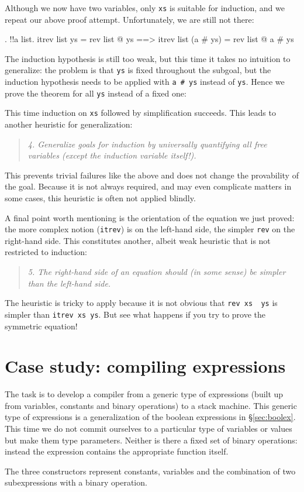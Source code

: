 Although we now have two variables, only \texttt{xs} is suitable for
induction, and we repeat our above proof attempt. Unfortunately, we are still
not there:
\begin{ttbox}\makeatother
{. !!a list.}
{\out       itrev list ys = rev list @ ys}
{\out       ==> itrev list (a # ys) = rev list @ a # ys}
\end{ttbox}
The induction hypothesis is still too weak, but this time it takes no
intuition to generalize: the problem is that \texttt{ys} is fixed throughout
the subgoal, but the induction hypothesis needs to be applied with
\texttt{a \# ys} instead of \texttt{ys}. Hence we prove the theorem
for all \texttt{ys} instead of a fixed one:
\begin{ttbox}\makeatother
\end{ttbox}
This time induction on \texttt{xs} followed by simplification succeeds. This
leads to another heuristic for generalization:
\begin{quote}
{\em 4. Generalize goals for induction by universally quantifying all free
variables {\em(except the induction variable itself!)}.}
\end{quote}
This prevents trivial failures like the above and does not change the
provability of the goal. Because it is not always required, and may even
complicate matters in some cases, this heuristic is often not
applied blindly.

A final point worth mentioning is the orientation of the equation we just
proved: the more complex notion (\texttt{itrev}) is on the left-hand
side, the simpler \texttt{rev} on the right-hand side. This constitutes
another, albeit weak heuristic that is not restricted to induction:
\begin{quote}
  {\em 5. The right-hand side of an equation should (in some sense) be
    simpler than the left-hand side.}
\end{quote}
The heuristic is tricky to apply because it is not obvious that
\texttt{rev xs \at\ ys} is simpler than \texttt{itrev xs ys}. But see what
happens if you try to prove the symmetric equation!


\section{Case study: compiling expressions}
\label{sec:ExprCompiler}

The task is to develop a compiler from a generic type of expressions (built
up from variables, constants and binary operations) to a stack machine.  This
generic type of expressions is a generalization of the boolean expressions in
\S\ref{sec:boolex}.  This time we do not commit ourselves to a particular
type of variables or values but make them type parameters.  Neither is there
a fixed set of binary operations: instead the expression contains the
appropriate function itself.
\begin{ttbox}
\end{ttbox}
The three constructors represent constants, variables and the combination of
two subexpressions with a binary operation.

